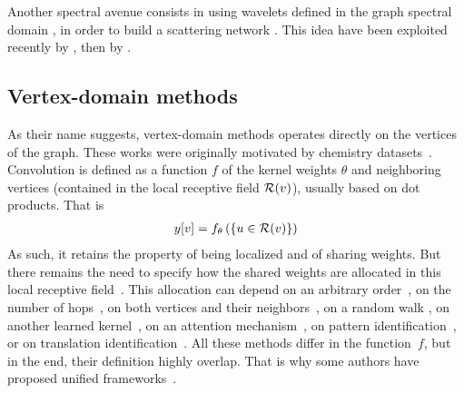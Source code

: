 Another spectral avenue consists in using wavelets defined in the graph spectral domain \citep{hammond2011wavelets}, in order to build a scattering network \citep{bruna2013invariant,chen2014unsupervised}. This idea have been exploited recently by \cite{zou2018Graph}, then by \cite{gama2018Diffusion}.

\subsection{Vertex-domain methods}
\label{sec:vert}

As their name suggests, vertex-domain methods operates directly on the vertices of the graph. These works were originally motivated by chemistry datasets~\citep{duvenaud2015convolutional,kearnes2016molecular}. Convolution is defined as a function $f$ of the kernel weights $\theta$ and neighboring vertices (contained in the local receptive field $\mathcal{R}(v)$), usually based on dot products. That is
\begin{gather}
y[v] = f_\theta\left(\{u \in \mathcal{R}(v)\}\right)
\end{gather}
As such, it retains the property of being localized and of sharing weights. But there remains the need to specify how the shared weights are allocated in this local receptive field~\citep{vialatte2016generalizing}. This allocation can depend on \eg an arbitrary order~\citep{niepert2016learning}, on the number of hops~\citep{atwood2016diffusion,du2017topology}, on both vertices and their neighbors~\citep{monti2016geometric,simonovsky2017dynamic}, on a random walk \citep{hechtlinger2017generalization}, on another learned kernel~\citep{vialatte2017learning}, on an attention mechanism~\citep{velickovic2017graph,lee2018attention}, on pattern identification~\citep{sankar2017motif}, or on translation identification~\citep{pasdeloup2017convolutional}. All these methods differ in the function~$f$, but in the end, their definition highly overlap. That is why some authors have proposed unified frameworks~\citep{gilmer2017neural}.

